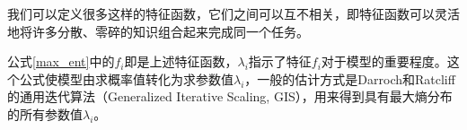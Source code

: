 \documentclass[master, winfont]{njuthesis}
\begin{document}
我们可以定义很多这样的特征函数，它们之间可以互不相关，即特征函数可以灵活地将许多分散、零碎的知识组合起来完成同一个任务。


公式\ref{max_ent}中的$f_i$即是上述特征函数，${\lambda}_{i}$指示了特征$f_i$对于模型的重要程度。这个公式使模型由求概率值转化为求参数值${\lambda}_{i}$，一般的估计方式是Darroch和Ratcliff的通用迭代算法（Generalized Iterative Scaling, GIS）\cite{Darroch1972Generalized}，用来得到具有最大熵分布的所有参数值${\lambda}_{i}$。
\end{document}
